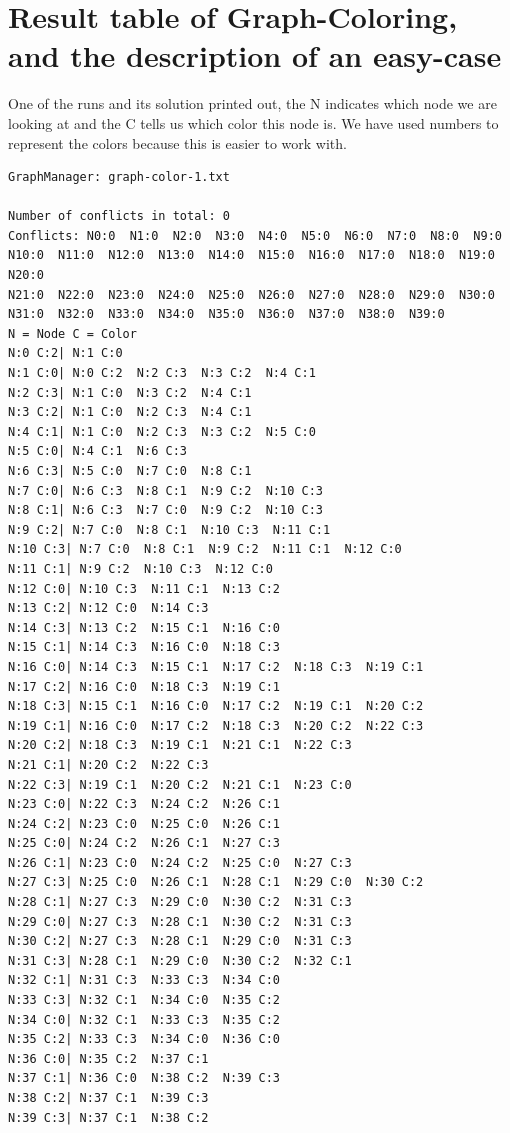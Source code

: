 \documentclass[12pt, a4paper]{article}
\begin{document}
\section{Result table of Graph-Coloring, and the description of an easy-case}
One of the runs and its solution printed out, the N indicates which node we are looking at and the C tells us which color this node is. We have used numbers to represent the colors because this is easier to work with.\\
\begin{verbatim}
GraphManager: graph-color-1.txt

Number of conflicts in total: 0
Conflicts: N0:0  N1:0  N2:0  N3:0  N4:0  N5:0  N6:0  N7:0  N8:0  N9:0  
N10:0  N11:0  N12:0  N13:0  N14:0  N15:0  N16:0  N17:0  N18:0  N19:0  N20:0
N21:0  N22:0  N23:0  N24:0  N25:0  N26:0  N27:0  N28:0  N29:0  N30:0
N31:0  N32:0  N33:0  N34:0  N35:0  N36:0  N37:0  N38:0  N39:0  
N = Node C = Color
N:0 C:2| N:1 C:0  
N:1 C:0| N:0 C:2  N:2 C:3  N:3 C:2  N:4 C:1  
N:2 C:3| N:1 C:0  N:3 C:2  N:4 C:1  
N:3 C:2| N:1 C:0  N:2 C:3  N:4 C:1  
N:4 C:1| N:1 C:0  N:2 C:3  N:3 C:2  N:5 C:0  
N:5 C:0| N:4 C:1  N:6 C:3  
N:6 C:3| N:5 C:0  N:7 C:0  N:8 C:1  
N:7 C:0| N:6 C:3  N:8 C:1  N:9 C:2  N:10 C:3  
N:8 C:1| N:6 C:3  N:7 C:0  N:9 C:2  N:10 C:3  
N:9 C:2| N:7 C:0  N:8 C:1  N:10 C:3  N:11 C:1  
N:10 C:3| N:7 C:0  N:8 C:1  N:9 C:2  N:11 C:1  N:12 C:0  
N:11 C:1| N:9 C:2  N:10 C:3  N:12 C:0  
N:12 C:0| N:10 C:3  N:11 C:1  N:13 C:2  
N:13 C:2| N:12 C:0  N:14 C:3  
N:14 C:3| N:13 C:2  N:15 C:1  N:16 C:0  
N:15 C:1| N:14 C:3  N:16 C:0  N:18 C:3  
N:16 C:0| N:14 C:3  N:15 C:1  N:17 C:2  N:18 C:3  N:19 C:1  
N:17 C:2| N:16 C:0  N:18 C:3  N:19 C:1  
N:18 C:3| N:15 C:1  N:16 C:0  N:17 C:2  N:19 C:1  N:20 C:2  
N:19 C:1| N:16 C:0  N:17 C:2  N:18 C:3  N:20 C:2  N:22 C:3  
N:20 C:2| N:18 C:3  N:19 C:1  N:21 C:1  N:22 C:3  
N:21 C:1| N:20 C:2  N:22 C:3  
N:22 C:3| N:19 C:1  N:20 C:2  N:21 C:1  N:23 C:0  
N:23 C:0| N:22 C:3  N:24 C:2  N:26 C:1  
N:24 C:2| N:23 C:0  N:25 C:0  N:26 C:1  
N:25 C:0| N:24 C:2  N:26 C:1  N:27 C:3  
N:26 C:1| N:23 C:0  N:24 C:2  N:25 C:0  N:27 C:3  
N:27 C:3| N:25 C:0  N:26 C:1  N:28 C:1  N:29 C:0  N:30 C:2  
N:28 C:1| N:27 C:3  N:29 C:0  N:30 C:2  N:31 C:3  
N:29 C:0| N:27 C:3  N:28 C:1  N:30 C:2  N:31 C:3  
N:30 C:2| N:27 C:3  N:28 C:1  N:29 C:0  N:31 C:3  
N:31 C:3| N:28 C:1  N:29 C:0  N:30 C:2  N:32 C:1  
N:32 C:1| N:31 C:3  N:33 C:3  N:34 C:0  
N:33 C:3| N:32 C:1  N:34 C:0  N:35 C:2  
N:34 C:0| N:32 C:1  N:33 C:3  N:35 C:2  
N:35 C:2| N:33 C:3  N:34 C:0  N:36 C:0  
N:36 C:0| N:35 C:2  N:37 C:1  
N:37 C:1| N:36 C:0  N:38 C:2  N:39 C:3  
N:38 C:2| N:37 C:1  N:39 C:3  
N:39 C:3| N:37 C:1  N:38 C:2  


\end{verbatim}
\end{document}
